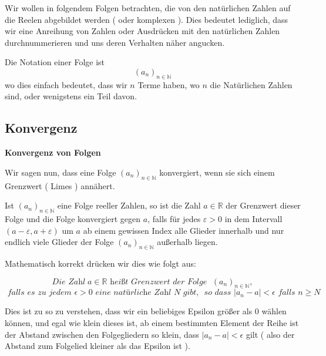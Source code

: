 \documentclass[smallheadings,headsepline,12pt,a4paper]{scrartcl}
\begin{document}
Wir wollen in folgendem Folgen betrachten, die von den natürlichen Zahlen auf die Reelen abgebildet werden ( oder komplexen ). Dies bedeutet lediglich, dass wir eine Anreihung von Zahlen oder Ausdrücken mit den natürlichen Zahlen durchnummerieren und uns deren Verhalten näher angucken.\\

\item Die Notation einer Folge ist $$ (a_n)_{n \in \mathbb{N}} $$ 
wo dies einfach bedeutet, dass wir $n$ Terme haben, wo $n$ die Natürlichen Zahlen sind, oder wenigstens ein Teil davon. \\

\newpage

\subsection*{Konvergenz}

\begin{center}
\item[\textbf{Konvergenz von Folgen}]
\end{center}
\item Wir sagen nun, dass eine Folge $ (a_n)_{n \in \mathbb{N}} $ konvergiert, wenn sie sich einem Grenzwert ( Limes ) annähert.\\

\item  Ist  ${\displaystyle (a_{n})_{n\in \mathbb {N} }}  $ eine Folge reeller Zahlen, so ist die Zahl ${\displaystyle a\in \mathbb {R} }  $  der Grenzwert dieser Folge und die Folge konvergiert gegen $a$, falls für jedes ${\displaystyle \varepsilon >0} $  in dem Intervall ${\displaystyle (a-\varepsilon ,a+\varepsilon )} $ um ${\displaystyle a} $ ab einem gewissen Index alle Glieder innerhalb und nur endlich viele Glieder der Folge ${\displaystyle (a_{n})_{n\in \mathbb {N} }} $ außerhalb liegen. \\

\item Mathematisch korrekt drücken wir dies wie folgt aus: 

$$ \textit{Die Zahl} \; a \in \mathbb{R} \textit{ heißt Grenzwert der Folge } \;  (a_n)_{n \in \mathbb{N}}, $$
$$  \textit{ falls es zu jedem } \epsilon > 0  \textit{ eine natürliche Zahl N gibt, $$
$$ so dass } |a_n -a | < \epsilon \textit{ falls } n \geq N $$

\item Dies ist zu so zu verstehen, dass wir ein beliebiges Epsilon größer als 0 wählen können, und egal wie klein dieses ist, ab einem bestimmten Element der Reihe ist der Abstand zwischen den Folgegliedern so klein, dass $ |a_n -a | < \epsilon $ gilt ( also der Abstand zum Folgelied kleiner als das Epsilon ist ). \\
\end{document}
